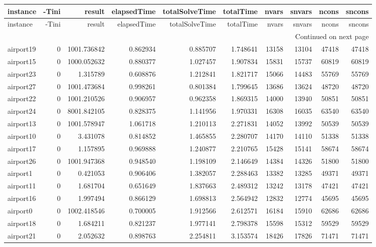 \begin{longtable}{|l|r|r|r|r|r|r|r|r|r|}
\toprule
instance & -Tini & result & elapsedTime & totalSolveTime & totalTime & nvars & snvars & ncons & sncons \\
\midrule
\endfirsthead
\toprule
instance & -Tini & result & elapsedTime & totalSolveTime & totalTime & nvars & snvars & ncons & sncons \\
\midrule
\endhead
\midrule
\multicolumn{10}{r}{Continued on next page} \\
\midrule
\endfoot
\bottomrule
\endlastfoot
airport19 & 0 & 1001.736842 & 0.862934 & 0.885707 & 1.748641 & 13158 & 13104 & 47418 & 47418 \\
airport15 & 0 & 1000.052632 & 0.880377 & 1.027457 & 1.907834 & 15831 & 15737 & 60819 & 60819 \\
airport23 & 0 & 1.315789 & 0.608876 & 1.212841 & 1.821717 & 15066 & 14483 & 55769 & 55769 \\
airport27 & 0 & 1001.473684 & 0.998261 & 0.801384 & 1.799645 & 13686 & 13624 & 48720 & 48720 \\
airport22 & 0 & 1001.210526 & 0.906957 & 0.962358 & 1.869315 & 14000 & 13940 & 50851 & 50851 \\
airport24 & 0 & 8001.842105 & 0.828375 & 1.141956 & 1.970331 & 16308 & 16035 & 63540 & 63540 \\
airport13 & 0 & 1001.578947 & 1.061718 & 1.210113 & 2.271831 & 14052 & 13992 & 50539 & 50539 \\
airport10 & 0 & 3.431078 & 0.814852 & 1.465855 & 2.280707 & 14170 & 14110 & 51338 & 51338 \\
airport17 & 0 & 1.157895 & 0.969888 & 1.240877 & 2.210765 & 15428 & 15141 & 58674 & 58674 \\
airport26 & 0 & 1001.947368 & 0.948540 & 1.198109 & 2.146649 & 14384 & 14326 & 51800 & 51800 \\
airport1 & 0 & 0.421053 & 0.906406 & 1.382057 & 2.288463 & 13382 & 13285 & 49371 & 49371 \\
airport11 & 0 & 1.681704 & 0.651649 & 1.837663 & 2.489312 & 13242 & 13178 & 47421 & 47421 \\
airport16 & 0 & 1.997494 & 0.866129 & 1.698813 & 2.564942 & 12832 & 12774 & 45695 & 45695 \\
airport0 & 0 & 1002.418546 & 0.700005 & 1.912566 & 2.612571 & 16184 & 15910 & 62686 & 62686 \\
airport18 & 0 & 1.684211 & 0.821237 & 1.977141 & 2.798378 & 15598 & 15312 & 59529 & 59529 \\
airport21 & 0 & 2.052632 & 0.898763 & 2.254811 & 3.153574 & 18426 & 17826 & 71471 & 71471 \\

\end{longtable}
